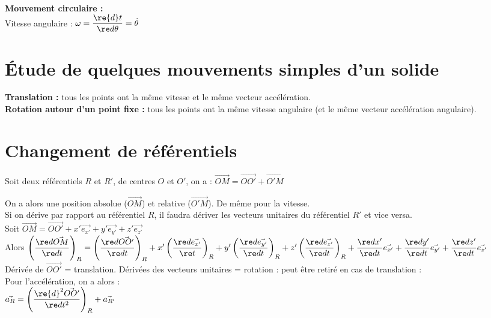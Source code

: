 \documentclass[13pt, twoside, a4paper, french]{report}
\begin{document}
    \\
    \textbf{Mouvement circulaire :}\\
    Vitesse angulaire : $\omega = \dfrac{\re{d}t}{\re d \theta} = \dot \theta$
  
  
  \section{Étude de quelques mouvements simples d’un solide}\label{sec:etude-de-quelques-mouvements-simples-dun-solide}
    
    \textbf{Translation :} tous les points ont la même vitesse et le même vecteur accélération.\\
    
    \textbf{Rotation autour d'un point fixe :} tous les points ont la même vitesse angulaire (et le même vecteur accélération angulaire).
  
  
  \section{Changement de référentiels}\label{sec:changement-de-referentiels}
    
    Soit deux référentiels $R$ et $R'$, de centres $O$ et $O'$, on a : $\vec{OM} = \vec{OO'} + \vec{O'M}$
    
    On a alors une position absolue ($\vec{OM}$) et relative ($\vec{O'M}$).
    De même pour la vitesse.\\
    
    Si on dérive par rapport au référentiel $R$, il faudra dériver les vecteurs unitaires du référentiel $R'$ et vice versa.\\
    
    Soit $\vec{OM} = \vec{OO'} + x' \vec{e_{x'}} + y' \vec{e_{y'}} + z' \vec{e_{z'}}$\\
    Alors $\left( \dfrac{\re d \vec{OM}}{\re d t} \right)_R =
\left( \dfrac{\re d \vec{OO'}}{\re d t} \right)_R + x' \left( \dfrac{\re d \vec{e_{x'}}}{\re t} \right)_R + y' \left( \dfrac{\re d \vec{e_{y'}}}{\re d t} \right)_R + z' \left( \dfrac{\re d \vec{e_{z'}}}{\re d t} \right)_R
+ \dfrac{\re d x'}{\re d t} \vec{e_{x'}} + \dfrac{\re d y'}{\re d t} \vec{e_{y'}} + \dfrac{\re d z'}{\re d t} \vec{e_{z'}}$\\
    
    Dérivée de $\vec{OO'}$ = translation.
    Dérivées des vecteurs unitaires = rotation : peut être retiré en cas de translation :\\
    Pour l'accélération, on a alors :\\
    
    $\vec{a_R} = \left( \dfrac{\re{d}^2 \vec{OO'}}{\re d t^2} \right)_R + \vec{a_{R'}}$
\end{document}
